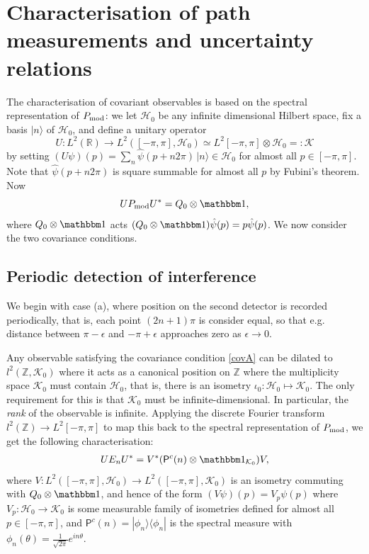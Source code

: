 \section{Characterisation of path measurements and uncertainty relations}
The characterisation of covariant observables is based on the spectral representation of $P_{\mathrm{mod}}$: we let $\mathcal H_0$ be any infinite dimensional Hilbert space, fix a basis $|n\rangle$ of $\mathcal H_0$, and define a unitary operator
$$U:L^2(\mathbb R) \to L^2([-\pi,\pi],\mathcal H_0)\simeq L^2[-\pi,\pi]\otimes \mathcal H_0=:\mathcal K$$
by setting $(U\psi)(p) = \sum_{n} \hat\psi(p+n2\pi) \,|n\rangle\in \mathcal H_0$ for almost all $p\in [-\pi,\pi]$. Note that $\hat\psi(p+n2\pi)$ is square summable for almost all $p$ by Fubini's theorem. Now
$$
U\MOD P U^* = Q_0\otimes \id,
$$
where $Q_0\otimes \id$ acts $(Q_0\otimes \id)\hat\psi(p) = p\hat\psi(p)$. We now consider the two covariance conditions.

\subsection{Periodic detection of interference}

We begin with case (a), where position on the second detector is recorded periodically, that is, each point $(2n+1)\pi$ is consider equal, so that e.g. distance between $\pi-\epsilon$ and $-\pi+\epsilon$ approaches zero as $\epsilon\rightarrow 0$.

Any observable satisfying the covariance condition \eqref{covA} can be dilated to $l^2(\mathbb Z, \mathcal K_0)$ where it acts as a canonical position on $\mathbb Z$ \cite{WERNER1990166} where the multiplicity space $\mathcal K_0$ must contain $\mathcal H_0$, that is, there is an isometry $\iota_0:\mathcal H_0\mapsto \mathcal K_0$. The only requirement for this is that $\mathcal K_0$ must be infinite-dimensional. In particular, the \emph{rank} of the observable is infinite. Applying the discrete Fourier transform $l^2(\mathbb Z)\to L^2[-\pi,\pi]$ to map this back to the spectral representation of $P_{\mathrm{mod}}$, we get the following characterisation:
\newcommand{\Pc}{\mathsf P^c}
\newcommand{\Qd}{Q_d}
\begin{align}
UE_nU^* = V^* (\Pc(n)\otimes \id_{\mathcal K_0})V,
\end{align}
where $V:L^2([-\pi,\pi],\mathcal H_0)\to L^2([-\pi,\pi],\mathcal K_0)$ is an isometry commuting with $Q_0\otimes \id$, and hence of the form $(V\psi)(p) = V_p\psi(p)$ where $V_p:\mathcal H_0\to \mathcal K_0$ is some measurable family of isometries defined for almost all $p\in [-\pi,\pi]$, and $\Pc(n)=|\phi_n\rangle\langle \phi_n|$ is the spectral measure with $\phi_n(\theta) = \frac {1}{\sqrt{2\pi}} e^{in\theta}$.

